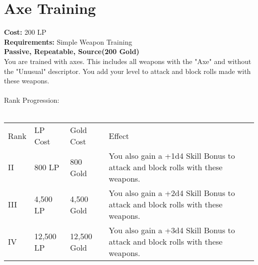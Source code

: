 \section{Axe Training}\label{perk:axeTraining}
\textbf{Cost:} 200 LP\\
\textbf{Requirements:} Simple Weapon Training\\
\textbf{Passive, Repeatable, Source(200 Gold)}\\
You are trained with axes.
This includes all weapons with the "Axe" and without the "Unusual" descriptor.
You add your level to attack and block rolls made with these weapons.\\
\\
Rank Progression:\\
\\
\begin{longtable}{l | l | l | p{9cm}}
	Rank & LP Cost & Gold Cost & Effect\\
	II & 800 LP & 800 Gold & You also gain a +1d4 Skill Bonus to attack and block rolls with these weapons.\\
	III & 4,500 LP & 4,500 Gold & You also gain a +2d4 Skill Bonus to attack and block rolls with these weapons.\\
	IV & 12,500 LP & 12,500 Gold & You also gain a +3d4 Skill Bonus to attack and block rolls with these weapons.\\
\end{longtable}